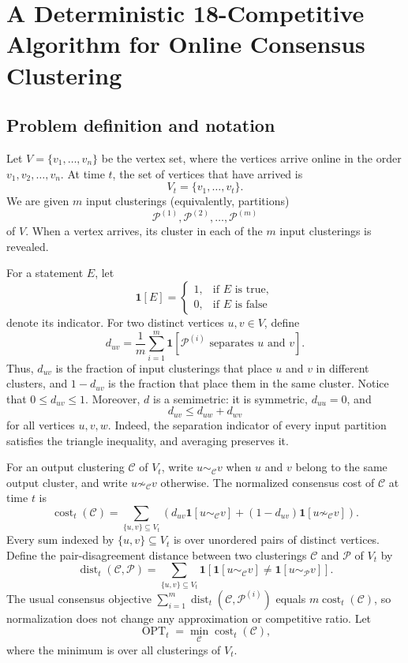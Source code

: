 \documentclass[11pt]{article}
\newcommand{\ind}{\mathbf{1}}
\newcommand{\cost}{\operatorname{cost}}
\newcommand{\OPT}{\operatorname{OPT}}
\begin{document}
\section{A Deterministic 18-Competitive Algorithm for Online Consensus Clustering}

\subsection{Problem definition and notation}

Let $V=\{v_1,\ldots,v_n\}$ be the vertex set, where the vertices arrive
online in the order $v_1,v_2,\ldots,v_n$.  At time $t$, the set of vertices
that have arrived is
\[
  V_t=\{v_1,\ldots,v_t\}.
\]
We are given $m$ input clusterings (equivalently, partitions)
\[
  \mathcal P^{(1)},\mathcal P^{(2)},\ldots,\mathcal P^{(m)}
\]
of $V$.  When a vertex arrives, its cluster in each of the $m$ input
clusterings is revealed.

For a statement $E$, let
\[
  \ind[E]=
  \begin{cases}
    1,&\text{if $E$ is true},\\
    0,&\text{if $E$ is false}
  \end{cases}
\]
denote its indicator.  For two distinct vertices $u,v\in V$, define
\[
 d_{uv}
 =\frac{1}{m}\sum_{i=1}^m
   \ind[\mathcal P^{(i)}\text{ separates }u\text{ and }v].
\]
Thus, $d_{uv}$ is the fraction of input clusterings that place $u$ and $v$
in different clusters, and $1-d_{uv}$ is the fraction that place them in the
same cluster.  Notice that $0\le d_{uv}\le1$.  Moreover, $d$ is a
semimetric: it is symmetric, $d_{uu}=0$, and
\[
  d_{uv}\le d_{uw}+d_{wv}
\]
for all vertices $u,v,w$.  Indeed, the separation indicator of every input
partition satisfies the triangle inequality, and averaging preserves it.

For an output clustering $\mathcal C$ of $V_t$, write
$u\sim_{\mathcal C}v$ when $u$ and $v$ belong to the same output cluster,
and write $u\not\sim_{\mathcal C}v$ otherwise.  The normalized consensus
cost of $\mathcal C$ at time $t$ is
\[
 \cost_t(\mathcal C)
 =\sum_{\{u,v\}\subseteq V_t}
   \left(
     d_{uv}\ind[u\sim_{\mathcal C}v]
     +(1-d_{uv})\ind[u\not\sim_{\mathcal C}v]
   \right).
\]
Every sum indexed by $\{u,v\}\subseteq V_t$ is over unordered pairs of
distinct vertices.  Define the pair-disagreement distance between two
clusterings $\mathcal C$ and $\mathcal P$ of $V_t$ by
\[
 \operatorname{dist}_t(\mathcal C,\mathcal P)
 =\sum_{\{u,v\}\subseteq V_t}
   \ind\!\left[
     \ind[u\sim_{\mathcal C}v]
     \ne
     \ind[u\sim_{\mathcal P}v]
   \right].
\]
The usual consensus objective
$\sum_{i=1}^m \operatorname{dist}_t(\mathcal C,\mathcal P^{(i)})$
equals $m\cost_t(\mathcal C)$, so normalization does not change any
approximation or competitive ratio.  Let
\[
  \OPT_t=\min_{\mathcal C}\cost_t(\mathcal C),
\]
where the minimum is over all clusterings of $V_t$.
\end{document}
